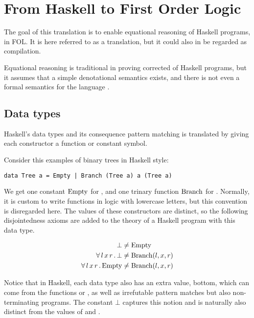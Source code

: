 \chapter{From Haskell to First Order Logic}

The goal of this translation is to enable equational reasoning of
Haskell programs, in FOL. It is here referred to as a translation, but
it could also in be regarded as compilation.

Equational reasoning is traditional in proving corrected of Haskell
programs, but it assumes that a simple denotational semantics exists,
and there is not even a formal semantics for the language
\cite{chasingbot}.

\section{Data types}

Haskell's data types and its consequence pattern matching is
translated by giving each constructor a function or constant symbol.

Consider this examples of binary trees in Haskell style:

\begin{verbatim}
data Tree a = Empty | Branch (Tree a) a (Tree a)
\end{verbatim}

We get one constant $\mathrm{Empty}$ for , and one trinary
function $\mathrm{Branch}$ for . Normally, it is custom
to write functions in logic with lowercase letters, but this
convention is disregarded here. The values of these constructors are
distinct, so the following disjointedness axioms are added to the
theory of a Haskell program with this data type.

\begin{align*}
\mathrm{\bot} &  \neq \mathrm{Empty}\\
 \forall \, l \,  x \,  r \,  . \,  \mathrm{\bot} &  \neq \mathrm{Branch}(l,x,r)\\
 \forall \, l \,  x \,  r \,  . \,  \mathrm{Empty} &  \neq \mathrm{Branch}(l,x,r)
\end{align*}

Notice that in Haskell, each data type also has an extra value, bottom, which
can come from the functions  or , as well as
irrefutable pattern matches but also non-terminating programs. The constant
$\bot$ captures this notion and is naturally also distinct from the values
of  and .

